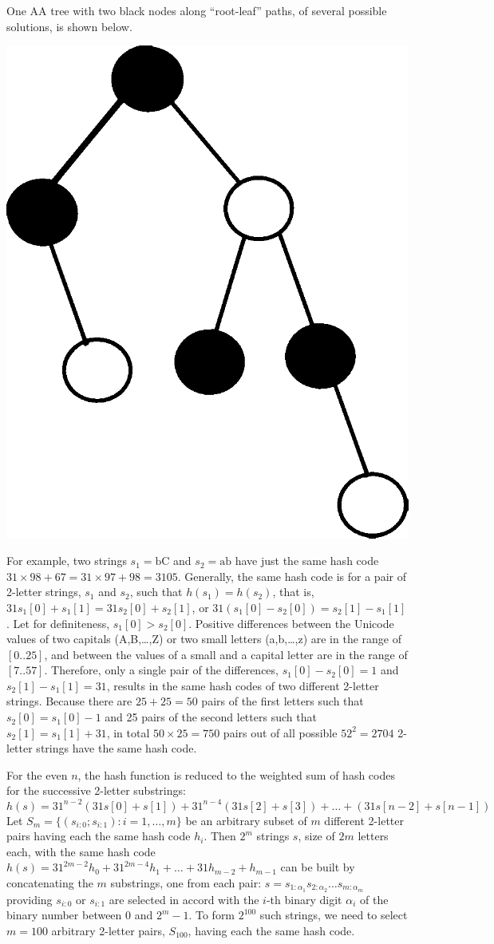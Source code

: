 One AA tree with two black nodes along ``root-leaf'' paths, of several
possible solutions, is shown below.
\begin{center}
\includegraphics[width=0.15\linewidth]{figs/sol-AA}
\end{center}


For example, 
two strings $s_1 = \mathrm{bC}$ and $s_2 = \mathrm{ab}$ have just the same hash code
$31\times98 + 67 = 31\times97 + 98 = 3105$. Generally, the same hash code is for a 
pair of 2-letter strings, $s_1$ and $s_2$, such that $h(s_1)=h(s_2)$, that is,
$31s_1[0] + s_1[1] = 31s_2[0] + s_2[1]$, or $31(s_1[0] - s_2[0]) = s_2[1] - s_1[1]$.
Let for definiteness, $s_1[0] > s_2[0]$. 
Positive differences between the Unicode values of two capitals (A,B,\ldots,Z) or two small
letters (a,b,\ldots,z) are in the range of $[0..25]$, and between the 
values of a small
and a capital letter are in the range of $[7..57]$. Therefore, only a single pair of
the differences, $s_1[0]-s_2[0] = 1$ and $s_2[1] - s_1[1] = 31$, results in the
same hash codes of two different 2-letter strings. Because there are $25 + 25 = 50$ 
pairs of the first letters such that $s_2[0] = s_1[0]-1$
and 25 pairs of the second letters such that $s_2[1] = s_1[1]+31$, in total $50 \times 25 = 750$ 
pairs out of all possible $52^2 = 2704$ 2-letter strings have the same hash code.

For the even $n$, the hash function is reduced to the weighted sum of
hash codes for the successive 2-letter substrings:
\[
h(s) = 31^{n-2}\left(31s[0]+s[1]\right) +  31^{n-4}\left(31s[2]+s[3]\right) + \ldots + \left(31s[n-2]+s[n-1]\right)
\]
Let $S_m=\{(s_{i:0};s_{i:1}): i=1,\ldots,m\}$ be an arbitrary subset of $m$ different 2-letter pairs 
having each the same hash code $h_i$. Then $2^m$ strings $s$, size of $2m$ letters each, with the
same hash code $h(s)=31^{2m-2}h_0+31^{2m-4}h_1+\ldots+31h_{m-2}+h_{m-1}$ can be built
by concatenating the $m$ substrings, one from each pair:
\(
s = s_{1:\alpha_1}s_{2:\alpha_2}\ldots s_{m:\alpha_m}
\)
providing
$s_{i:0}$ or $s_{i:1}$ are selected in accord with the $i$-th binary digit $\alpha_i$ of
the binary number between 0 and $2^m- 1$. To form $2^{100}$ such strings,
we need to select $m=100$ arbitrary 2-letter pairs, $S_{100}$, having each the same hash code.


